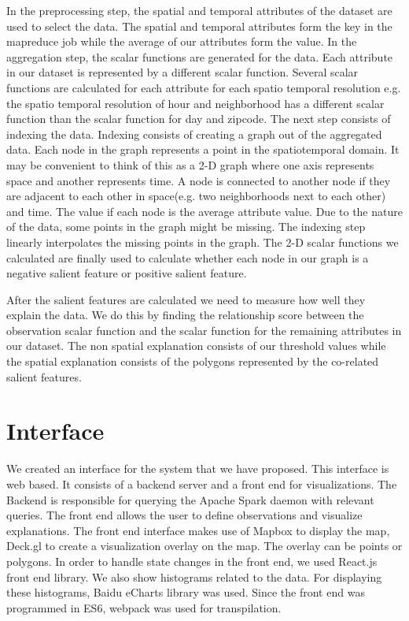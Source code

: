 In the preprocessing step, the spatial and temporal attributes of the dataset are used to select the data. The spatial and temporal attributes form the key in the mapreduce job while the average of our attributes form the value. In the aggregation step, the scalar functions are generated for the data. Each attribute in our dataset is represented by a different scalar function. Several scalar functions are calculated for each attribute for each spatio temporal resolution e.g. the spatio temporal resolution of hour and neighborhood has a different scalar function than the scalar function for day and zipcode. The next step consists of indexing the data. Indexing consists of creating a graph out of the aggregated data. Each node in the graph represents a point in the spatiotemporal domain. It may be convenient to think of this as a 2-D graph where one axis represents space and another represents time. A node is connected to another node if they are adjacent to each other in space(e.g. two neighborhoods next to each other) and time. The value if each node is the average attribute value. Due to the nature of the data, some points in the graph might be missing. The indexing step linearly interpolates the missing points in the graph. The 2-D scalar functions we calculated are finally used to calculate whether each node in our graph is a negative salient feature or positive salient feature.

After the salient features are calculated we need to measure how well they explain the data. We do this by finding the relationship score between the observation scalar function and the scalar function for the remaining attributes in our dataset. The non spatial explanation consists of our threshold values while the spatial explanation consists of the polygons represented by the co-related salient features.


\section{Interface}
We created an interface for the system that we have proposed. This interface is web based. It consists of a backend server and a front end for visualizations. The Backend is responsible for querying the Apache Spark daemon with relevant queries. The front end allows the user to define observations and visualize explanations. The front end interface makes use of Mapbox to display the map, Deck.gl to create a visualization overlay on the map. The overlay can be points or polygons. In order to handle state changes in the front end, we used React.js front end library. We also show histograms related to the data. For displaying these histograms, Baidu eCharts library was used. Since the front end was programmed in ES6, webpack was used for transpilation. 

